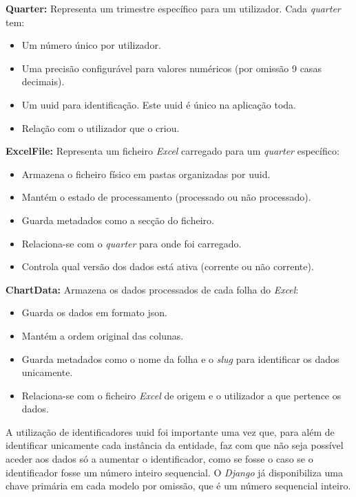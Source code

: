 \textbf{Quarter:} Representa um trimestre específico para um utilizador. Cada \textit{quarter} tem:
\begin{itemize}
    \item Um número único por utilizador.
    \item Uma precisão configurável para valores numéricos (por omissão 9 casas decimais).
    \item Um \gls{uuid} para identificação. Este \gls{uuid} é único na aplicação toda.
    \item Relação com o utilizador que o criou.
\end{itemize}

\textbf{ExcelFile:} Representa um ficheiro \textit{Excel} carregado para um \textit{quarter} específico:
\begin{itemize}
    \item Armazena o ficheiro físico em pastas organizadas por \gls{uuid}.
    \item Mantém o estado de processamento (processado ou não processado).
    \item Guarda metadados como a secção do ficheiro.
    \item Relaciona-se com o \textit{quarter} para onde foi carregado.
    \item Controla qual versão dos dados está ativa (corrente ou não corrente).
\end{itemize}

\textbf{ChartData:} Armazena os dados processados de cada folha do \textit{Excel}:
\begin{itemize}
    \item Guarda os dados em formato \gls{json}.
    \item Mantém a ordem original das colunas.
    \item Guarda metadados como o nome da folha e o \textit{slug} para identificar os dados unicamente.
    \item Relaciona-se com o ficheiro \textit{Excel} de origem e o utilizador a que pertence os dados.
\end{itemize}

A utilização de identificadores \gls{uuid} foi importante uma vez que, para além de identificar unicamente cada instância da entidade, faz com que não seja possível aceder aos dados só a aumentar o identificador, como se fosse o caso se o identificador fosse um número inteiro sequencial. O \textit{Django} já disponibiliza uma chave primária em cada modelo por omissão, que é um número sequencial inteiro.

